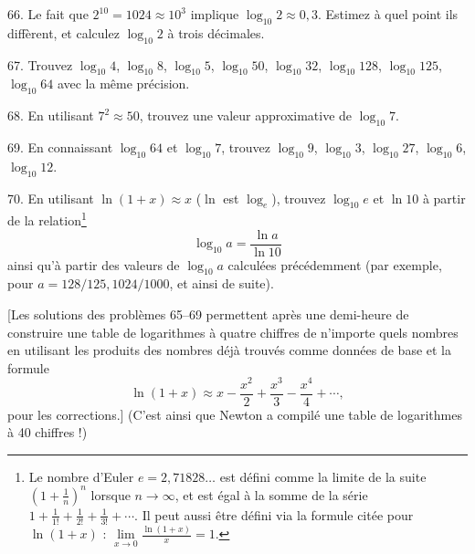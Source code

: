 \begin{problem}{66.}
    Le fait que $2^{10}=1024 \approx 10^3$ implique
    $\log_{10} 2 \approx 0,3$. Estimez à quel point ils diffèrent, et calculez $\log_{10} 2$ à trois décimales.
\end{problem}

\begin{problem}{67.}
    Trouvez $\log_{10} 4$, $\log_{10} 8$,
    $\log_{10} 5$, $\log_{10} 50$, $\log_{10} 32$, $\log_{10} 128$,
    $\log_{10} 125$, $\log_{10} 64$ avec la même précision.
\end{problem}
\begin{problem}{68.}
    En utilisant $7^2 \approx 50$, trouvez une valeur approximative de $\log_{10} 7$.
\end{problem}

\begin{problem}{69.}
    En connaissant $\log_{10} 64$ et $\log_{10} 7$, trouvez $\log_{10} 9$, $\log_{10} 3$,
    $\log_{10} 27$, $\log_{10} 6$, $\log_{10} 12$.
\end{problem}

\begin{problem}{70.}
    En utilisant $\ln (1+x) \approx x$ ($\ln$ est $\log_e$), trouvez $\log_{10} e$ et
    $\ln 10$ à partir de la relation\footnote{Le nombre d’Euler $e = 2{,}71828\dots$ est défini comme la limite de la suite
    $\left(1+\frac{1}{n}\right)^n$ lorsque $n\to \infty$, et est égal à la somme de la série
    $1+\frac{1}{1!} +\frac{1}{2!}+\frac{1}{3!}+\dotsb$. Il peut aussi être défini via la formule citée pour
    $\ln (1+x)$ : $\lim\limits_{x\to 0}\frac{\ln(1+x)}{x} = 1$.}
    \begin{equation*}
        \log_{10} a=\frac{\ln a}{\ln 10}
    \end{equation*}
    ainsi qu’à partir des valeurs de $\log_{10} a$ calculées précédemment (par exemple, pour $a=128/125, 1024/1000$,
    et ainsi de suite).

    [Les solutions des problèmes 65--69 permettent après une demi-heure de construire une table de logarithmes
    à quatre chiffres de n’importe quels nombres en utilisant les produits des nombres déjà trouvés comme données de base et la formule
    \begin{equation*}
        \ln (1+x) \approx x-\frac{x^2}{2}+\frac{x^3}{3}-\frac{x^4}{4}+\dotsb,
    \end{equation*}
    pour les corrections.] (C’est ainsi que Newton a compilé une table
    de logarithmes à 40 chiffres !)
\end{problem}

